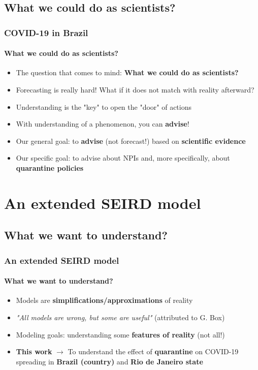\documentclass{beamer}
\begin{document}
\subsection{What we could do as scientists?}

\begin{frame} 
\frametitle{COVID-19 in Brazil} 
\framesubtitle{What we could do as scientists?} 
\begin{itemize}
    \item The question that comes to mind: \textbf{What we could do as scientists?}
    \item Forecasting is really hard! What if it does not match with reality afterward?
    \item Understanding is the "key" to open the "door" of actions
    \item With understanding of a phenomenon, you can \textbf{advise}!
    \item Our general goal: to \textbf{advise} (not forecast!) based on \textbf{scientific evidence}
    \item Our specific goal: to advise about NPIs and, more specifically, about \textbf{quarantine policies}
\end{itemize}
\end{frame}

\section{An extended SEIRD model}

\subsection{What we want to understand?}

\begin{frame} 
\frametitle{An extended SEIRD model} 
\framesubtitle{What we want to understand?} 

\begin{itemize}
    \item Models are \textbf{simplifications/approximations} of reality
    \item \textit{"All models are wrong, but some are useful"} (attributed to G. Box)
    \item Modeling goals: understanding some \textbf{features of reality} (not all!)
    \item \textbf{This work} $\to$ To understand the effect of \textbf{quarantine} on COVID-19 spreading in \textbf{Brazil (country)} and \textbf{Rio de Janeiro state}
\end{itemize}

\end{frame}
\end{document}
